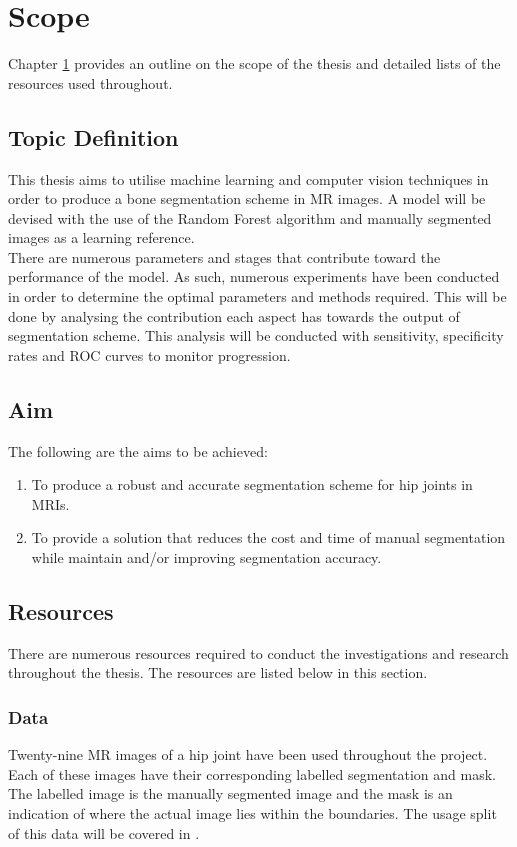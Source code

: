 \chapter{Scope}
\label{chpt: scope}
Chapter \ref{chpt: scope} provides an outline on the scope of the thesis and detailed lists of the resources used throughout. 
\section{Topic Definition}
This thesis aims to utilise machine learning and computer vision techniques in order to produce a bone segmentation scheme in MR images.
A model will be devised with the use of the Random Forest algorithm and manually segmented images as a learning reference. 
\\[1\baselineskip]
There are numerous parameters and stages that contribute toward the performance of the model. As such, numerous experiments have been conducted in order to determine the optimal parameters and methods required. This will be done by analysing the contribution each aspect has towards the output of segmentation scheme. This analysis will be conducted with sensitivity, specificity rates and ROC curves to monitor progression. 

\section{Aim}
The following are the aims to be achieved:
\begin{enumerate}
	\item To produce a robust and accurate segmentation scheme for hip joints in MRIs.
	\item To provide a solution that reduces the cost and time of manual segmentation while maintain and/or improving segmentation accuracy.
\end{enumerate}
\section{Resources}
There are numerous resources required to conduct the investigations and research throughout the thesis. The resources are listed below in this section. 
\subsection{Data}
Twenty-nine MR images of a hip joint have been used throughout the project. Each of these images have their corresponding labelled segmentation and mask. The labelled image is the manually segmented image and the mask is an indication of where the actual image lies within the boundaries. The usage split of this data will be covered in .
